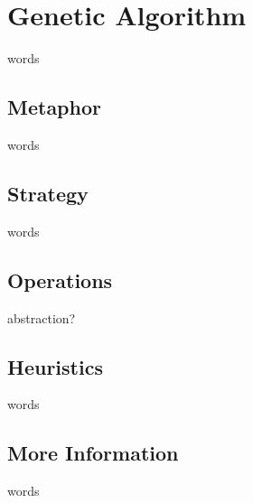 %
%


%
%
\section{Genetic Algorithm}
words


%
%
\subsection{Metaphor}
words

%
%
\subsection{Strategy}
words


%
%
\subsection{Operations}
abstraction?


%
%
\subsection{Heuristics}
words

%
%
\subsection{More Information}
words


